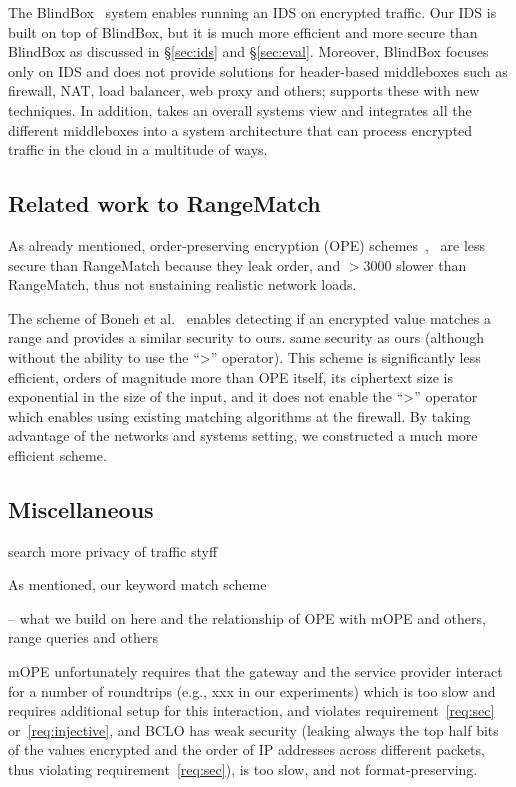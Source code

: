 The BlindBox~\cite{blindbox} system enables running an IDS on encrypted traffic. Our IDS is built on top of BlindBox, but it is much more efficient and more secure than BlindBox as discussed in \S\ref{sec:ids} and \S\ref{sec:eval}. Moreover, BlindBox focuses only on IDS and does not provide solutions for header-based middleboxes such as firewall, NAT, load balancer, web proxy and others;  \sys supports these with new techniques. In addition, \sys takes an overall systems view and integrates all the different middleboxes into a system architecture that can process encrypted traffic in the cloud in a multitude of ways.




\subsection{Related work to RangeMatch}

As already mentioned, order-preserving encryption  (OPE) schemes~\cite{boldyreva:ope},~\cite{popa:mope} are less secure than RangeMatch because they leak order, and $>3000$ slower than RangeMatch, thus not sustaining realistic network loads.

The scheme of Boneh et al.~\cite{BonehRange} enables detecting if an encrypted value matches a range and provides a similar security to ours.  same security as ours (although without the ability to use the ``>'' operator). 
This scheme is significantly less efficient, orders of magnitude more than OPE itself, its ciphertext size is exponential in the size of the input, and it does not enable the ``>'' operator which enables using existing matching algorithms at the firewall. By taking advantage of the networks and systems setting, we constructed  a much more efficient scheme. 


\subsection{Miscellaneous}

search more privacy of traffic styff


As mentioned, our keyword match scheme 

-- what we build on here and the relationship of OPE with mOPE and others, range queries and others


 mOPE unfortunately requires that the gateway and the service provider interact for a number of roundtrips (e.g., xxx in our experiments) which is too slow and requires additional setup for this interaction, and violates requirement~\ref{req:sec} or~\ref{req:injective}, and BCLO has weak security (leaking always the top half bits of the values encrypted and the order of IP addresses across different packets, thus violating requirement~\ref{req:sec}), is too slow, and not format-preserving. 

